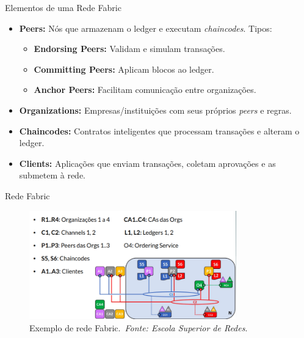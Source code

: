 \begin{frame}{Elementos de uma Rede Fabric}

	\begin{itemize}
		\item \textbf{Peers:} Nós que armazenam o ledger e executam
		      \textit{chaincodes}. Tipos:
		      \begin{itemize}
			      \item \textbf{Endorsing Peers:} Validam e simulam transações.
			      \item \textbf{Committing Peers:} Aplicam blocos ao ledger.
			      \item \textbf{Anchor Peers:} Facilitam comunicação entre
			            organizações.
		      \end{itemize}
		\item \textbf{Organizations:} Empresas/instituições com seus próprios
		      \textit{peers} e regras.
		\item \textbf{Chaincodes:} Contratos inteligentes que processam transações e
		      alteram o ledger.
		\item \textbf{Clients:} Aplicações que enviam transações, coletam aprovações
		      e as submetem à rede.
	\end{itemize}

\end{frame}

\begin{frame}{Rede Fabric}

	\begin{figure}
		\centering
		\includegraphics[width=0.8\textwidth]{figures/fabricexample.png}
		\caption{Exemplo de rede Fabric.\ \textit{Fonte: Escola Superior de Redes}.}
		\label{fig:fabricexample}
	\end{figure}

\end{frame}
